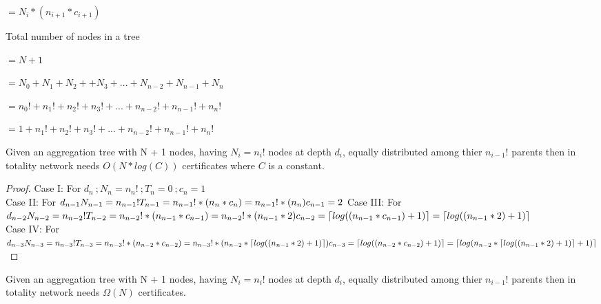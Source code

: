 												$= N_{i} * (n_{i+1} * c_{i+1})$

Total number of nodes in a tree  
												
												$= N + 1$
												
												$= N_{0} + N_{1} + N_{2} + + N_{3} + ... + N_{n-2} + N_{n-1} + N_{n}$
												
												$= n_{0}! + n_{1}! + n_{2}! + n_{3}! + ...	+ n_{n-2}!  + n_{n-1}! + n_{n}!$
												
												$= 1 + n_{1}! + n_{2}! + n_{3}! + ...	+ n_{n-2}!  + n_{n-1}! + n_{n}!$

\begin{theorem}
	Given an aggregation tree with N + 1 nodes, having $N_{i} = n_{i}!$ nodes at depth $d_{i}$, equally distributed among thier $n_{i-1}!$ parents then in totality network needs $O(N*log(C))$ certificates where $C$ is a constant.
\end{theorem}

\begin{proof}
	
	Case I: For $d_{n}\ ; N_{n} = n_{n}!\ ; T_{n} = 0\ ; c_{n} = 1 $\\
	Case II: For $d_{n - 1}\\ N_{n - 1} = n_{n - 1}!\\ T_{n - 1} = n_{n - 1}! * (n_{n} * c_{n}) = n_{n - 1}! * (n_{n} )\\ c_{n - 1} = 2\\ $
	Case III: For $d_{n - 2}\\ N_{n - 2} = n_{n - 2}!\\ T_{n -2} = n_{n - 2}! * (n_{n - 1} * c_{n - 1}) = n_{n - 2}! * (n_{n - 1 } * 2) \\ c_{n - 2} = \lceil log((n_{n - 1} *c_{n - 1}) + 1) \rceil = \lceil log((n_{n - 1} * 2) + 1) \rceil $\\
	Case IV: For $d_{n - 3}\\ N_{n - 3} = n_{n - 3}!\\ T_{n -3} = n_{n - 3}! * (n_{n - 2} * c_{n - 2}) = n_{n - 3}! * (n_{n - 2 } * \lceil log((n_{n - 1} * 2 ) + 1) \rceil ) \\ c_{n - 3} = \lceil log((n_{n - 2} * c_{n - 2}) + 1) \rceil = \lceil log( n_{n - 2} *\lceil log((n_{n - 1} * 2 ) + 1) \rceil + 1) \rceil $\\
\end{proof}

\begin{theorem}
		Given an aggregation tree with N + 1 nodes, having $N_{i} = n_{i}!$ nodes at depth $d_{i}$, equally distributed among thier $n_{i-1}!$ parents then in totality network needs $\Omega(N)$ certificates.
\end{theorem}

